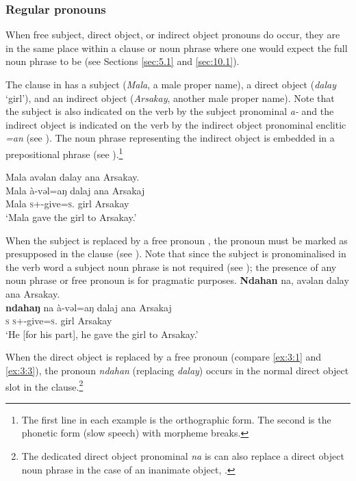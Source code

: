 \subsubsection{Regular pronouns}\label{sec:3.1.1.1}
\largerpage[2]
When free subject, direct object, or indirect object pronouns do occur, they are in the same place within a clause or noun phrase where one would expect the full noun phrase to be (see Sections \ref{sec:5.1} and \ref{sec:10.1}). 

The clause in  has a subject (\textit{Mala}, a male proper name), a direct object (\textit{dalay} ‘girl’), and an indirect object (\textit{Arsakay}, another male proper name).  Note that the subject is also indicated on the verb by the subject pronominal \textit{a-} and the indirect object is indicated on the verb by the indirect object pronominal enclitic \textit{=an} (see ). The noun phrase representing the indirect object is embedded in a prepositional phrase (see ).\footnote{The first line in each example is the orthographic form. The second is the phonetic form (slow speech) with morpheme breaks.} 

\ea \label{ex:3:1}
Mala  avəlan  dalay  ana  Arsakay.\\
\gll  Mala   à-vəl=aŋ     dalaj   ana   Arsakaj\\
      Mala   \textsc{s}+{\PFV}-give=\textsc{s}.{\IO}  girl  {\DAT} Arsakay\\
\glt ‘Mala gave the girl to Arsakay.’
\z

When the subject is replaced by a free pronoun , the pronoun must be marked as presupposed in the clause (see ). Note that since the subject is pronominalised in the verb word a subject noun phrase is not required (see ); the presence of any noun phrase or free pronoun is for pragmatic purposes.
\ea \label{ex:3:2}
\textbf{Ndahan} na,    avəlan  dalay  ana  Arsakay.\\
\gll  \textbf{ndahaŋ}  na    à-vəl=aŋ     dalaj   ana   Arsakaj\\
      \textsc{s}    {\PSP}  \textsc{s}+{\PFV}-give=\textsc{s}.{\IO}  girl  {\DAT} Arsakay\\
\glt ‘He [for his part], he gave the girl to Arsakay.’
\z

When the direct object is replaced by a free pronoun (compare \ref{ex:3:1} and \ref{ex:3:3}), the pronoun \textit{ndahan} (replacing \textit{dalay}) occurs in the normal direct object slot in the clause.\footnote{The dedicated direct object pronominal \textit{na} is can also replace a direct object noun phrase in the case of an inanimate object, .}  

